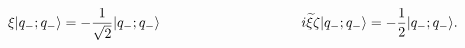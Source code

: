 \begin{equation}
\label{mm}
\xi|q_-;q_- \rangle=-\frac{1}{\sqrt{2}}|q_-;q_- \rangle
\hspace{1.4in}
i{\widetilde \xi}\zeta|q_-;q_- \rangle=-\frac{1}{2}|q_-;q_- 
\rangle.
\end{equation}

